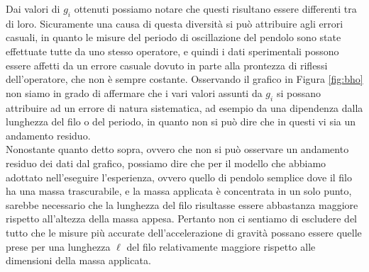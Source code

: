 Dai valori di $g_i$ ottenuti possiamo notare che questi risultano essere differenti tra di loro. Sicuramente una causa di questa diversità si può attribuire agli errori casuali, in quanto le misure del periodo di oscillazione del pendolo sono state effettuate tutte da uno stesso operatore, e quindi i dati sperimentali possono essere affetti da un errore casuale dovuto in parte alla prontezza di riflessi dell'operatore, che non è sempre costante. %
Osservando il grafico in Figura \ref{fig:bho} non siamo in grado di affermare che i vari valori assunti da $g_i$ si possano attribuire ad un errore di natura sistematica, ad esempio da una dipendenza dalla lunghezza del filo o del periodo, in quanto non si può dire che in questi vi sia un andamento residuo.\\
Nonostante quanto detto sopra, ovvero che non si può osservare un andamento residuo dei dati dal grafico, possiamo dire che per il modello che abbiamo adottato nell'eseguire l'esperienza, ovvero quello di pendolo semplice dove il filo ha una massa trascurabile, e la massa applicata è concentrata in un solo punto, sarebbe necessario che la lunghezza del filo risultasse essere abbastanza maggiore rispetto all'altezza della massa appesa. Pertanto non ci sentiamo di escludere del tutto che le misure più accurate dell'accelerazione di gravità possano essere quelle prese per una lunghezza $\ell$ del filo relativamente maggiore rispetto alle dimensioni della massa applicata.
